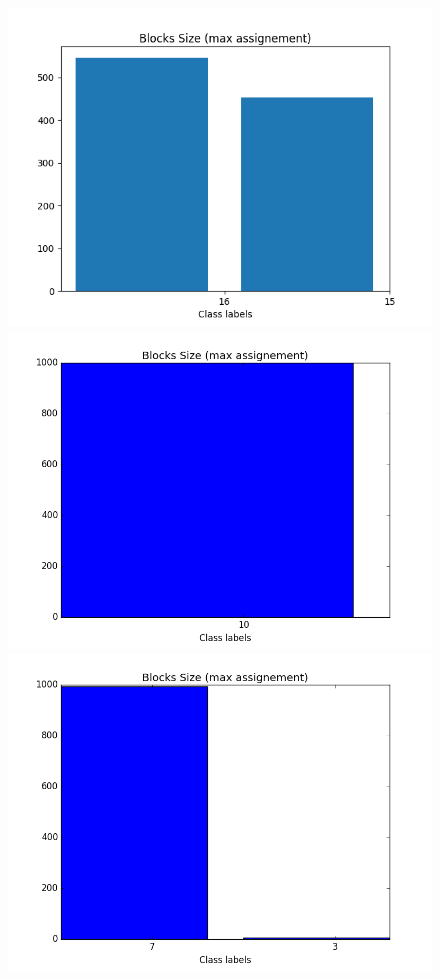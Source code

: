 \documentclass[a4paper, 12pt]{article}
\begin{document}
\begin{figure}[ht]
	\includegraphics[scale=0.27]{img/expe/1_mmsb/figure_3}
	\endminipage
	\includegraphics[scale=0.27]{img/expe/2_mmsb/figure_3} 
	\endminipage
	\includegraphics[scale=0.27]{img/expe/3_mmsb/figure_3}
	\endminipage


\end{figure}
\end{document}
